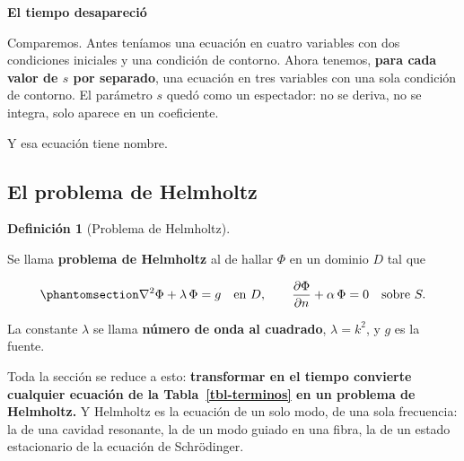 \documentclass[
  spanish,
  a4paper,
]{scrbook}
\theoremstyle{definition}
\newtheorem{definition}{Definición}[chapter]
\theoremstyle{plain}
\theoremstyle{definition}
\theoremstyle{plain}
\theoremstyle{definition}
\theoremstyle{remark}
\begin{document}
\begin{tcolorbox}[enhanced jigsaw, arc=.35mm, bottomrule=.15mm, breakable, colback=white, colframe=quarto-callout-important-color-frame, left=2mm, leftrule=.75mm, opacityback=0, rightrule=.15mm, toprule=.15mm]
\begin{minipage}[t]{5.5mm}
\textcolor{quarto-callout-important-color}{\faExclamation}
\end{minipage}%
\begin{minipage}[t]{\textwidth - 5.5mm}

\vspace{-3mm}\textbf{El tiempo desapareció}\vspace{3mm}

Comparemos. Antes teníamos una ecuación en cuatro variables con dos
condiciones iniciales y una condición de contorno. Ahora tenemos,
\textbf{para cada valor de \(s\) por separado}, una ecuación en tres
variables con una sola condición de contorno. El parámetro \(s\) quedó
como un espectador: no se deriva, no se integra, solo aparece en un
coeficiente.

Y esa ecuación tiene nombre.

\end{minipage}%
\end{tcolorbox}

\subsection{El problema de Helmholtz}\label{sec-helmholtz}

\begin{definition}[Problema de
Helmholtz]\protect\hypertarget{def-helmholtz}{}\label{def-helmholtz}

Se llama \textbf{problema de Helmholtz} al de hallar \(\Phi\) en un
dominio \(D\) tal que

\begin{equation}\protect\phantomsection\label{eq-helmholtz}{
\nabla^2\Phi + \lambda\,\Phi = g \quad\text{en } D, \qquad
\frac{\partial\Phi}{\partial n} + \alpha\,\Phi = 0 \quad\text{sobre } S .
}\end{equation}

La constante \(\lambda\) se llama \textbf{número de onda al cuadrado},
\(\lambda = k^2\), y \(g\) es la fuente.

\end{definition}

Toda la sección se reduce a esto: \textbf{transformar en el tiempo
convierte cualquier ecuación de la Tabla~\ref{tbl-terminos} en un
problema de Helmholtz.} Y Helmholtz es la ecuación de un solo modo, de
una sola frecuencia: la de una cavidad resonante, la de un modo guiado
en una fibra, la de un estado estacionario de la ecuación de
Schrödinger.
\end{document}
